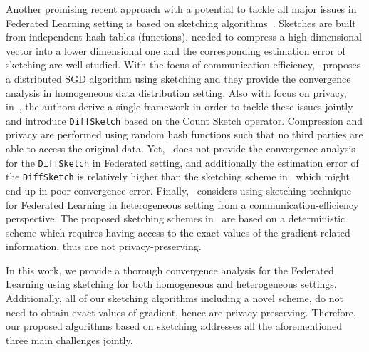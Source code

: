 \documentclass[twoside]{article}
\newcommand{\todo}[1]{\textcolor{red}{ToDo:~#1}}
\begin{document}
Another promising recent approach with a potential to tackle all major issues in Federated Learning setting is based on sketching algorithms~\cite{DBLP:journals/tcs/CharikarCF04,cormode2005improved,kleinberg2003bursty,Proc:Li_Church_Hastie_NIPS08}. Sketches are built from independent hash tables (functions), needed to compress a high dimensional vector into a lower dimensional one and the corresponding estimation error of sketching are well studied. With the focus of communication-efficiency,~\cite{ivkin2019communication} proposes a distributed SGD algorithm using sketching and they provide the convergence analysis in homogeneous data distribution setting. Also with focus on privacy,  in~\cite{li2019privacy}, the authors derive a single framework in order to tackle these issues jointly and introduce \texttt{DiffSketch} based on the Count Sketch operator. Compression and privacy are performed using random hash functions such that no third parties are able to access the original data. Yet,~\cite{li2019privacy} does not provide the convergence analysis for the \texttt{DiffSketch} in Federated setting, and additionally the estimation error of the \texttt{DiffSketch} is relatively higher than the sketching scheme in~\cite{ivkin2019communication} which might end up in poor convergence error. Finally,~\cite{rothchild2020fetchsgd} considers using sketching technique for Federated Learning in heterogeneous setting from a communication-efficiency perspective. The proposed sketching schemes in~\cite{ivkin2019communication,rothchild2020fetchsgd} are based on a deterministic scheme which requires having access to the exact values of the gradient-related information, thus are not privacy-preserving.   

In this work, we provide a thorough convergence analysis for the Federated Learning using sketching for both homogeneous and heterogeneous settings. Additionally, all of our sketching algorithms including a novel scheme, do not need to obtain exact values of gradient, hence are privacy preserving. Therefore, our proposed algorithms based on sketching addresses all the aforementioned three main challenges jointly.  




\end{document}
